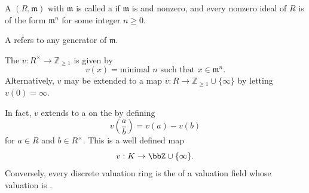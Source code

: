 \begin{definition} \label{definition:discrete_valuation_ring}
    A   $(R, \mathfrak{m})$ with  $\mathfrak{m}$ is called a  if $\mathfrak{m}$ is  and nonzero, and every nonzero ideal of $R$ is of the form $\mathfrak{m}^n$ for some integer $n \geq 0$.

    A  refers to any generator of $\mathfrak{m}$.

    The  $v: R^\times \to \mathbb{Z}_{\geq 1}$ is given by
    $$v(x) = \text{minimal } n \text{ such that } x \in \mathfrak{m}^n.$$
    Alternatively, $v$ may be extended to a map $v: R \to \mathbb{Z}_{\geq 1} \cup \{\infty\}$ by letting $v(0) = \infty$. 

    In fact, $v$ extends to a  on the  by defining
    $$v\left( \frac{a}{b} \right) = v(a) - v(b)$$
    for $a \in R$ and $b \in R^\times$. This is a well defined map
    $$v: K \to \bbZ \cup \{\infty\}.$$
    Conversely, every discrete valuation ring is the  of a valuation field whose valuation is .
\end{definition}
